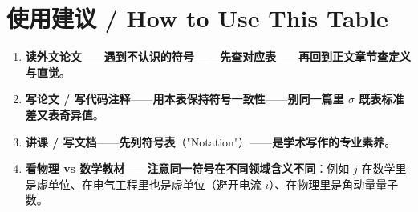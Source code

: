 \section{使用建议 / How to Use This Table}

\begin{enumerate}
\item \textbf{读外文论文}——\textbf{遇到不认识的符号——\textbf{先查\textbf{对应表}}}——\textbf{再回到正文章节查\textbf{定义与直觉}}。
\item \textbf{写论文 / 写代码注释}——\textbf{用本表保持\textbf{符号一致性}}——\textbf{别同一篇里 $\sigma$ 既表标准差又表奇异值}。
\item \textbf{讲课 / 写文档}——\textbf{先列\textbf{符号表}}（"Notation"）——\textbf{是学术写作的\textbf{专业素养}}。
\item \textbf{看物理 vs 数学教材}——\textbf{注意\textbf{同一符号在不同领域含义不同}}：例如 $j$ 在数学里是虚单位、在电气工程里也是虚单位（避开电流 $i$）、在物理里是角动量量子数。
\end{enumerate}

\clearpage
